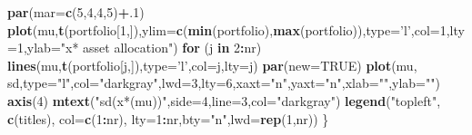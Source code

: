 \documentclass[]{article}
\newenvironment{Shaded}{\begin{snugshade}}{\end{snugshade}}
\newcommand{\KeywordTok}[1]{\textcolor[rgb]{0.13,0.29,0.53}{\textbf{#1}}}
\newcommand{\DataTypeTok}[1]{\textcolor[rgb]{0.13,0.29,0.53}{#1}}
\newcommand{\DecValTok}[1]{\textcolor[rgb]{0.00,0.00,0.81}{#1}}
\newcommand{\StringTok}[1]{\textcolor[rgb]{0.31,0.60,0.02}{#1}}
\newcommand{\OtherTok}[1]{\textcolor[rgb]{0.56,0.35,0.01}{#1}}
\newcommand{\ControlFlowTok}[1]{\textcolor[rgb]{0.13,0.29,0.53}{\textbf{#1}}}
\newcommand{\OperatorTok}[1]{\textcolor[rgb]{0.81,0.36,0.00}{\textbf{#1}}}
\newcommand{\NormalTok}[1]{#1}
\begin{document}
\begin{Shaded}
\begin{Highlighting}[]
  \KeywordTok{par}\NormalTok{(}\DataTypeTok{mar=}\KeywordTok{c}\NormalTok{(}\DecValTok{5}\NormalTok{,}\DecValTok{4}\NormalTok{,}\DecValTok{4}\NormalTok{,}\DecValTok{5}\NormalTok{)}\OperatorTok{+}\NormalTok{.}\DecValTok{1}\NormalTok{)}
  \KeywordTok{plot}\NormalTok{(mu,}\KeywordTok{t}\NormalTok{(portfolio[}\DecValTok{1}\NormalTok{,]),}\DataTypeTok{ylim=}\KeywordTok{c}\NormalTok{(}\KeywordTok{min}\NormalTok{(portfolio),}\KeywordTok{max}\NormalTok{(portfolio)),}\DataTypeTok{type=}\StringTok{'l'}\NormalTok{,}\DataTypeTok{col=}\DecValTok{1}\NormalTok{,}\DataTypeTok{lty=}\DecValTok{1}\NormalTok{,}\DataTypeTok{ylab=}\StringTok{"x* asset allocation"}\NormalTok{)}
  \ControlFlowTok{for}\NormalTok{ (j }\ControlFlowTok{in} \DecValTok{2}\OperatorTok{:}\NormalTok{nr) }\KeywordTok{lines}\NormalTok{(mu,}\KeywordTok{t}\NormalTok{(portfolio[j,]),}\DataTypeTok{type=}\StringTok{'l'}\NormalTok{,}\DataTypeTok{col=}\NormalTok{j,}\DataTypeTok{lty=}\NormalTok{j)}
  \KeywordTok{par}\NormalTok{(}\DataTypeTok{new=}\OtherTok{TRUE}\NormalTok{)}
  \KeywordTok{plot}\NormalTok{(mu, sd,}\DataTypeTok{type=}\StringTok{"l"}\NormalTok{,}\DataTypeTok{col=}\StringTok{"darkgray"}\NormalTok{,}\DataTypeTok{lwd=}\DecValTok{3}\NormalTok{,}\DataTypeTok{lty=}\DecValTok{6}\NormalTok{,}\DataTypeTok{xaxt=}\StringTok{"n"}\NormalTok{,}\DataTypeTok{yaxt=}\StringTok{"n"}\NormalTok{,}\DataTypeTok{xlab=}\StringTok{""}\NormalTok{,}\DataTypeTok{ylab=}\StringTok{""}\NormalTok{)}
  \KeywordTok{axis}\NormalTok{(}\DecValTok{4}\NormalTok{)}
  \KeywordTok{mtext}\NormalTok{(}\StringTok{"sd(x*(mu))"}\NormalTok{,}\DataTypeTok{side=}\DecValTok{4}\NormalTok{,}\DataTypeTok{line=}\DecValTok{3}\NormalTok{,}\DataTypeTok{col=}\StringTok{"darkgray"}\NormalTok{)}
  \KeywordTok{legend}\NormalTok{(}\StringTok{"topleft"}\NormalTok{, }\KeywordTok{c}\NormalTok{(titles), }\DataTypeTok{col=}\KeywordTok{c}\NormalTok{(}\DecValTok{1}\OperatorTok{:}\NormalTok{nr), }\DataTypeTok{lty=}\DecValTok{1}\OperatorTok{:}\NormalTok{nr,}\DataTypeTok{bty=}\StringTok{"n"}\NormalTok{,}\DataTypeTok{lwd=}\KeywordTok{rep}\NormalTok{(}\DecValTok{1}\NormalTok{,nr)) }
\NormalTok{\}}
\end{Highlighting}
\end{Shaded}
\end{document}
